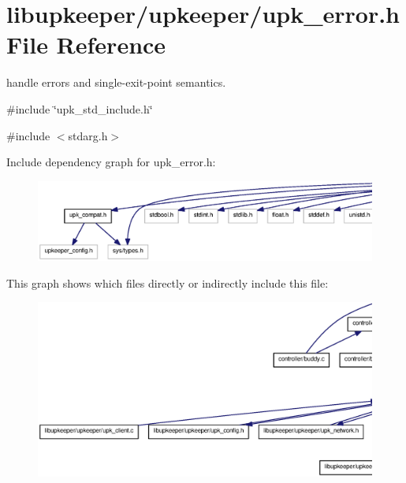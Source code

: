 \section{libupkeeper/upkeeper/upk\_\-error.h File Reference}
\label{upk__error_8h}


handle errors and single-\/exit-\/point semantics.  


{\ttfamily \#include \char`\"{}upk\_\-std\_\-include.h\char`\"{}}\par
{\ttfamily \#include $<$stdarg.h$>$}\par
Include dependency graph for upk\_\-error.h:\nopagebreak
\begin{figure}[H]
\begin{center}
\leavevmode
\includegraphics[width=400pt]{upk__error_8h__incl}
\end{center}
\end{figure}
This graph shows which files directly or indirectly include this file:
\nopagebreak
\begin{figure}[H]
\begin{center}
\leavevmode
\includegraphics[width=400pt]{upk__error_8h__dep__incl}
\end{center}
\end{figure}
